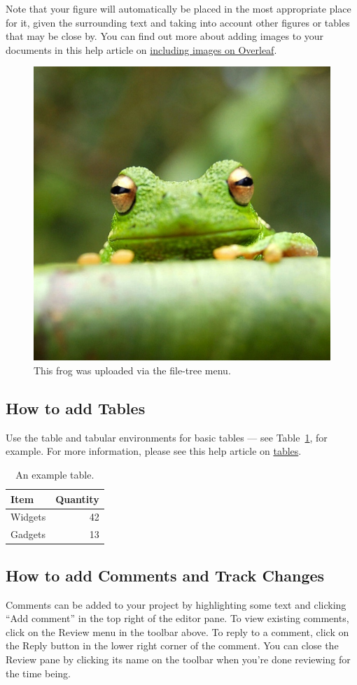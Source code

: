 \documentclass{article}
\begin{document}
	Note that your figure will automatically be placed in the most appropriate
	place for it, given the surrounding text and taking into account other figures
	or tables that may be close by. You can find out more about adding images to
	your documents in this help article on
	\href{https://www.overleaf.com/learn/how-to/Including_images_on_Overleaf}{including
	images on Overleaf}.

	\begin{figure}
		\centering
		\includegraphics[width=0.25\linewidth]{frog.jpg}
		\caption{\label{fig:frog}This frog was uploaded via the file-tree menu.}
	\end{figure}

	\subsection{How to add Tables}

	Use the table and tabular environments for basic tables --- see Table~\ref{tab:widgets},
	for example. For more information, please see this help article on \href{https://www.overleaf.com/learn/latex/tables}{tables}.

	\begin{table}
		\centering
		\begin{tabular}{l|r}
			Item    & Quantity \\
			\hline
			Widgets & 42       \\
			Gadgets & 13
		\end{tabular}
		\caption{\label{tab:widgets}An example table.}
	\end{table}

	\subsection{How to add Comments and Track Changes}

	Comments can be added to your project by highlighting some text and clicking
	``Add comment'' in the top right of the editor pane. To view existing
	comments, click on the Review menu in the toolbar above. To reply to a
	comment, click on the Reply button in the lower right corner of the comment.
	You can close the Review pane by clicking its name on the toolbar when you're
	done reviewing for the time being.
\end{document}
